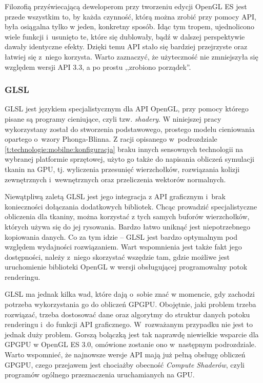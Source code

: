 			Filozofią przyświecającą deweloperom przy tworzeniu edycji OpenGL ES jest przede wszystkim to, by każda czynność, którą można zrobić przy pomocy API, była osiągalna tylko w jeden, konkretny sposób. Idąc tym tropem, ujednolicono wiele funkcji i~usunięto te, które się dublowały, bądź w dalszej perspektywie dawały identyczne efekty. Dzięki temu API stało się bardziej przejrzyste oraz łatwiej się z~niego korzysta. Warto zaznaczyć, że użyteczność nie zmniejszyła się względem wersji API 3.3, a po prostu ,,zrobiono porządek''.
			
			\subsubsection{GLSL}
			\label{t:technologie:narzedzia:ogl:glsl}
			
			
			GLSL jest językiem specjalistycznym dla API OpenGL, przy pomocy którego pisane są programy cieniujące, czyli tzw. \emph{shadery}. W niniejszej pracy wykorzystany został do stworzenia podstawowego, prostego modelu cieniowania opartego o~wzory Phonga-Blinna. Z racji opisanego w~podrozdziale \ref{t:technologie:mobilne:konfiguracja} braku innych sensownych technologii na wybranej platformie sprzętowej, użyto go także do napisania obliczeń symulacji tkanin na GPU, tj. wyliczenia przesunięć wierzchołków, rozwiązania kolizji zewnętrznych i~wewnętrznych oraz przeliczenia wektorów normalnych.
			
			Niewątpliwą zaletą GLSL jest jego integracja z API graficznym i~brak konieczności dołączania dodatkowych bibliotek. Chcąc prowadzić specjalistyczne obliczenia dla tkaniny, można korzystać z tych samych buforów wierzchołków, których używa się do jej rysowania. Bardzo łatwo uniknąć jest niepotrzebnego kopiowania danych. Co za tym idzie -- GLSL jest bardzo optymalnym pod względem wydajności rozwiązaniem. Wart wspomnienia jest także fakt jego dostępności, należy z~niego skorzystać wszędzie tam, gdzie możliwe jest uruchomienie biblioteki OpenGL w wersji obsługującej programowalny potok renderingu. 
			
			GLSL ma jednak kilka wad, które dają o~sobie znać w momencie, gdy zachodzi potrzeba wykorzystania go do obliczeń GPGPU. Obojętnie, jaki problem trzeba rozwiązać, trzeba dostosować dane oraz algorytmy do struktur danych potoku renderingu i~do funkcji API graficznego. W~rozważanym przypadku nie jest to jednak duży problem. Gorszą bolączką jest tak naprawdę niewielkie wsparcie dla GPGPU w OpenGL ES 3.0, omówione zostanie ono w~następnym podrozdziale. Warto wspomnieć, że najnowsze wersje API mają już pełną obsługę obliczeń GPGPU, czego przejawem jest chociażby obecność \emph{Compute Shaderów}, czyli programów ogólnego przeznaczenia uruchamianych na GPU.
			
